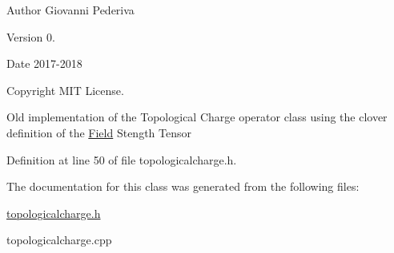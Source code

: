 \begin{DoxyAuthor}{Author}
Giovanni Pederiva 
\end{DoxyAuthor}
\begin{DoxyVersion}{Version}
0. 
\end{DoxyVersion}
\begin{DoxyDate}{Date}
2017-\/2018 
\end{DoxyDate}
\begin{DoxyCopyright}{Copyright}
M\+IT License.
\end{DoxyCopyright}
Old implementation of the Topological Charge operator class using the clover definition of the \hyperlink{classField}{Field} Stength Tensor 

Definition at line 50 of file topologicalcharge.\+h.



The documentation for this class was generated from the following files\+:\begin{DoxyCompactItemize}
\item 
\hyperlink{topologicalcharge_8h}{topologicalcharge.\+h}\item 
topologicalcharge.\+cpp\end{DoxyCompactItemize}
